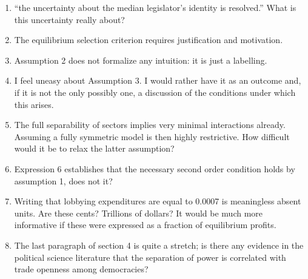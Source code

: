 \documentclass[12pt]{article}
\begin{document}
\begin{enumerate}
	\item “the uncertainty about the median legislator’s identity is resolved.” What is this uncertainty really about?
	\item The equilibrium selection criterion requires justification and motivation.
	\item Assumption 2 does not formalize any intuition: it is just a labelling.
	\item I feel uneasy about Assumption 3. I would rather have it as an outcome and, if it is not the only possibly one, a discussion of the conditions under which this arises.
	\item The full separability of sectors implies very minimal interactions already. Assuming a fully symmetric model is then highly restrictive. How difficult would it be to relax the latter assumption?
	\item Expression 6 establishes that the necessary second order condition holds by assumption 1, does not it?
	\item Writing that lobbying expenditures are equal to 0.0007 is meaningless absent units. Are these cents? Trillions of dollars? It would be much more informative if these were expressed as a fraction of equilibrium profits.
	\item The last paragraph of section 4 is quite a stretch; is there any evidence in the political science literature that the separation of power is correlated with trade openness among democracies?
\end{enumerate}
\end{document}
